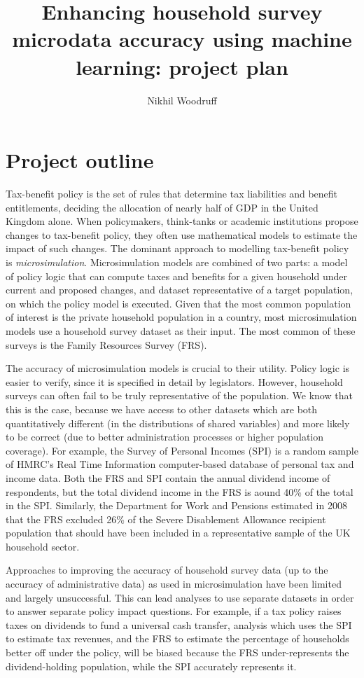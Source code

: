 \documentclass[twocolumn]{article}
\title{Enhancing household survey microdata accuracy using machine learning: project plan}
\date{}
\author{Nikhil Woodruff}
\begin{document}
\maketitle

\section{Project outline}

Tax-benefit policy is the set of rules that determine tax liabilities and benefit entitlements, deciding the allocation of nearly half of GDP in the United Kingdom alone. When policymakers, think-tanks or academic institutions propose changes to tax-benefit policy, they often use mathematical models to estimate the impact of such changes. The dominant approach to modelling tax-benefit policy is \emph{microsimulation}. Microsimulation models are combined of two parts: a model of policy logic that can compute taxes and benefits for a given household under current and proposed changes, and dataset representative of a target population, on which the policy model is executed. Given that the most common population of interest is the private household population in a country, most microsimulation models use a household survey dataset as their input. The most common of these surveys is the Family Resources Survey (FRS).

The accuracy of microsimulation models is crucial to their utility. Policy logic is easier to verify, since it is specified in detail by legislators. However, household surveys can often fail to be truly representative of the population. We know that this is the case, because we have access to other datasets which are both quantitatively different (in the distributions of shared variables) and more likely to be correct (due to better administration processes or higher population coverage). For example, the Survey of Personal Incomes (SPI) is a random sample of HMRC's Real Time Information computer-based database of personal tax and income data. Both the FRS and SPI contain the annual dividend income of respondents, but the total dividend income in the FRS is aound 40\% of the total in the SPI.\cite{frs_capital_income} Similarly, the Department for Work and Pensions estimated in 2008 that the FRS excluded 26\% of the Severe Disablement Allowance recipient population that should have been included in a representative sample of the UK household sector.\cite{dwp_110}

Approaches to improving the accuracy of household survey data (up to the accuracy of administrative data) as used in microsimulation have been limited and largely unsuccessful. This can lead analyses to use separate datasets in order to answer separate policy impact questions. For example, if a tax policy raises taxes on dividends to fund a universal cash transfer, analysis which uses the SPI to estimate tax revenues, and the FRS to estimate the percentage of households better off under the policy, will be biased because the FRS under-represents the dividend-holding population, while the SPI accurately represents it.
\end{document}
